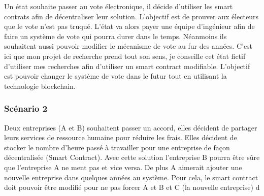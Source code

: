 Un état souhaite passer au vote électronique, il décide d’utiliser les smart contrats afin de
décentraliser leur solution. L’objectif est de prouver aux électeurs que le vote n’est pas truqué. L’état va
alors payer une équipe d’ingénieur afin de faire un système de vote qui pourra durer dans le temps.
Néanmoins ils souhaitent aussi pouvoir modifier le mécanisme de vote au fur des années. C’est ici que
mon projet de recherche prend tout son sens, je conseille cet état fictif d’utiliser mes recherches afin
d’utiliser un smart contract modifiable. L’objectif est pouvoir changer le système de vote dans le futur
tout en utilisant la technologie blockchain.

\subsubsection{Scénario 2}

Deux entreprises (A et B) souhaitent passer un accord, elles décident de partager leurs services
de ressource humaine pour réduire les frais. Elles décident de stocker le nombre d’heure passé à
travailler pour une entreprise de façon décentralisée (Smart Contract). Avec cette solution l’entreprise B
pourra être sûre que l’entreprise A ne ment pas et vice versa. De plus A aimerait ajouter une nouvelle
entreprise dans quelques années au système. Pour cela, le smart contract doit pouvoir être modifié pour
ne pas forcer A et B et C (la nouvelle entreprise) d
